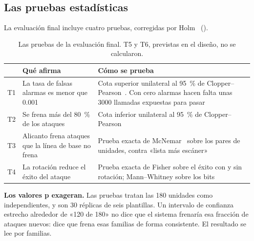 \subsection{Las pruebas estadísticas}

La evaluación final incluye cuatro pruebas, corregidas por Holm~\cite{holm}
().

\begin{table}[ht]
\caption{Las pruebas de la evaluación final. T5 y T6, previstas en el diseño, no se calcularon.}\label{tab:pruebas-def}
\small
\begin{tabularx}{\textwidth}{@{}P{0.8cm}LL@{}}
\toprule
 & Qué afirma & Cómo se prueba \\
\midrule
T1 & La tasa de falsas alarmas es menor que \num{0.001} & Cota superior unilateral al
  \qty{95}{\percent} de Clopper--Pearson~\cite{clopper}. Con cero alarmas hacen falta unas
  \num{3000} llamadas expuestas para pasar \\
T2 & Se frena más del \qty{80}{\percent} de los ataques & Cota inferior unilateral al
  \qty{95}{\percent} de Clopper--Pearson \\
T3 & Alicanto frena ataques que la línea de base no frena & Prueba exacta de McNemar~\cite{mcnemar}
  sobre los pares de unidades, contra «lista más escáner» \\
T4 & La rotación reduce el éxito del ataque & Prueba exacta de Fisher sobre el éxito con y sin
  rotación; Mann--Whitney sobre los bits \\
\bottomrule
\end{tabularx}
\end{table}

\begin{limite}
\textbf{Los valores p exageran.} Las pruebas tratan las 180 unidades como independientes, y son 30
réplicas de seis plantillas. Un intervalo de confianza estrecho alrededor de «120 de 180» no dice
que el sistema frenaría esa fracción de ataques nuevos: dice que frena esas familias de forma
consistente. El resultado se lee por familias.
\end{limite}
